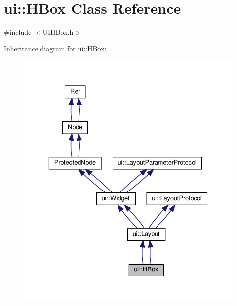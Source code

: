 \hypertarget{classui_1_1HBox}{}\section{ui\+:\+:H\+Box Class Reference}
\label{classui_1_1HBox}


{\ttfamily \#include $<$U\+I\+H\+Box.\+h$>$}



Inheritance diagram for ui\+:\+:H\+Box\+:
\nopagebreak
\begin{figure}[H]
\begin{center}
\leavevmode
\includegraphics[width=329pt]{classui_1_1HBox__inherit__graph}
\end{center}
\end{figure}


